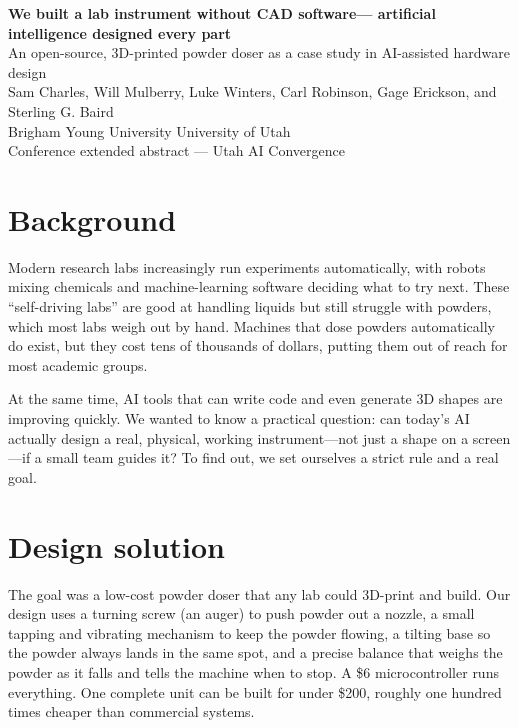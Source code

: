 \documentclass[11pt]{article}
\begin{document}
\begin{center}
  {\LARGE\bfseries We built a lab instrument without CAD software---%
  artificial intelligence designed every part}\\[6pt]
  {\large An open-source, 3D-printed powder doser as a case study in
  AI-assisted hardware design}\\[8pt]
  {\normalsize Sam Charles, Will Mulberry, Luke Winters, Carl Robinson,
  Gage Erickson, and Sterling G. Baird}\\[2pt]
  {\small Brigham Young University \quad\textbar\quad University of Utah}\\[2pt]
  {\small Conference extended abstract --- Utah AI Convergence}
\end{center}

\vspace{4pt}
\noindent{}

\section{Background}

Modern research labs increasingly run experiments automatically, with robots
mixing chemicals and machine-learning software deciding what to try next.
These ``self-driving labs'' are good at handling liquids but still struggle
with powders, which most labs weigh out by hand. Machines that dose powders
automatically do exist, but they cost tens of thousands of dollars, putting
them out of reach for most academic groups.

At the same time, AI tools that can write code and even generate 3D shapes
are improving quickly. We wanted to know a practical question: can today's AI
actually design a real, physical, working instrument---not just a shape on a
screen---if a small team guides it? To find out, we set ourselves a strict
rule and a real goal.

\section{Design solution}

The goal was a low-cost powder doser that any lab could 3D-print and build.
Our design uses a turning screw (an auger) to push powder out a nozzle, a
small tapping and vibrating mechanism to keep the powder flowing, a tilting
base so the powder always lands in the same spot, and a precise balance that
weighs the powder as it falls and tells the machine when to stop. A \$6
microcontroller runs everything. One complete unit can be built for under
\$200, roughly one hundred times cheaper than commercial systems.
\end{document}
